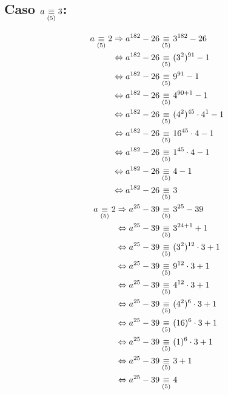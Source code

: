 \documentclass[a4paper,spanish]{article}
\begin{document}
  \subsection*{Caso $a \underset{(5)}\equiv 3$:}
  \begin{align*}
    a \underset{(5)}\equiv 2 \Rightarrow a^{182} - 26 &\underset{(5)}\equiv 3^{182} - 26              \\
                   \Leftrightarrow  a^{182} - 26 &\underset{(5)}\equiv (3^2)^{91} - 1            \\
                   \Leftrightarrow  a^{182} - 26 &\underset{(5)}\equiv 9^{91} - 1                \\
                   \Leftrightarrow  a^{182} - 26 &\underset{(5)}\equiv 4^{90 + 1} - 1            \\
                   \Leftrightarrow  a^{182} - 26 &\underset{(5)}\equiv (4^2)^{45} \cdot 4^1 - 1  \\
                   \Leftrightarrow  a^{182} - 26 &\underset{(5)}\equiv 16^{45} \cdot 4 - 1       \\
                   \Leftrightarrow  a^{182} - 26 &\underset{(5)}\equiv 1^{45} \cdot 4 - 1        \\
                   \Leftrightarrow  a^{182} - 26 &\underset{(5)}\equiv 4 - 1                     \\
                   \Leftrightarrow  a^{182} - 26 &\underset{(5)}\equiv 3                         \\
    a \underset{(5)}\equiv 2 \Rightarrow a^{25} - 39  &\underset{(5)}\equiv 3^{25} - 39               \\
                   \Leftrightarrow  a^{25} - 39  &\underset{(5)}\equiv 3^{24 + 1} + 1            \\
                   \Leftrightarrow  a^{25} - 39  &\underset{(5)}\equiv (3^2)^{12} \cdot 3 + 1    \\
                   \Leftrightarrow  a^{25} - 39  &\underset{(5)}\equiv 9^{12} \cdot 3 + 1        \\
                   \Leftrightarrow  a^{25} - 39  &\underset{(5)}\equiv 4^{12} \cdot 3 + 1        \\
                   \Leftrightarrow  a^{25} - 39  &\underset{(5)}\equiv (4^2)^{6} \cdot 3 + 1     \\
                   \Leftrightarrow  a^{25} - 39  &\underset{(5)}\equiv (16)^{6} \cdot 3 + 1      \\
                   \Leftrightarrow  a^{25} - 39  &\underset{(5)}\equiv (1)^{6} \cdot 3 + 1       \\
                   \Leftrightarrow  a^{25} - 39  &\underset{(5)}\equiv 3 + 1                     \\
                   \Leftrightarrow  a^{25} - 39  &\underset{(5)}\equiv 4                         \\
  \end{align*}
\end{document}
